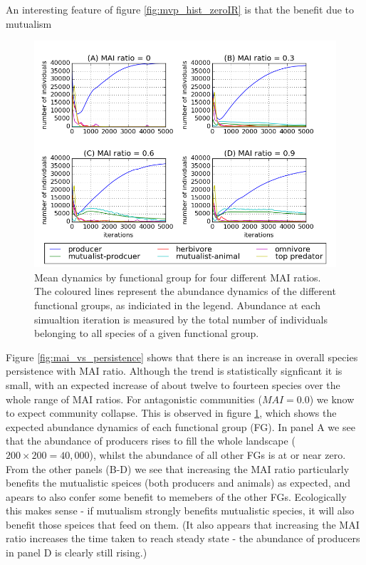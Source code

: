An interesting feature of figure \ref{fig:mvp_hist_zeroIR} is that the benefit due to mutualism 


\begin{figure}[h!]
	\centering
	\includegraphics[width=0.8\linewidth]{"figures/persistence/mean_trophic_dynamics"}
	\caption{Mean dynamics by functional group for four different MAI ratios. The coloured lines represent the abundance dynamics of the different functional groups, as indiciated in the legend. Abundance at each simualtion iteration is measured by the total number of individuals belonging to all species of a given functional group.}
	\label{fig:mvp_mean_dynamics}
\end{figure}


Figure \ref{fig:mai_vs_persistence} shows that there is an increase in overall species persistence with MAI ratio. Although the trend is statistically signficant it is small, with an expected increase of about twelve to fourteen species over the whole range of MAI ratios. For antagonistic communities ($MAI=0.0$) we know to expect community collapse. This is observed in figure \ref{fig:mvp_mean_dynamics}, which shows the expected abundance dynamics of each functional group (FG). In panel A we see that the abundance of producers rises to fill the whole landscape ($200 \times 200=40,000$), whilst the abundance of all other FGs is at or near zero. From the other panels (B-D) we see that increasing the MAI ratio particularly benefits the mutualistic speices (both producers and animals) as expected, and apears to also confer some benefit to memebers of the other FGs. Ecologically this makes sense - if mutualism strongly benefits mutualistic species, it will also benefit those speices that feed on them. (It also appears that increasing the MAI ratio increases the time taken to reach steady state - the abundance of producers in panel D is clearly still rising.) 

